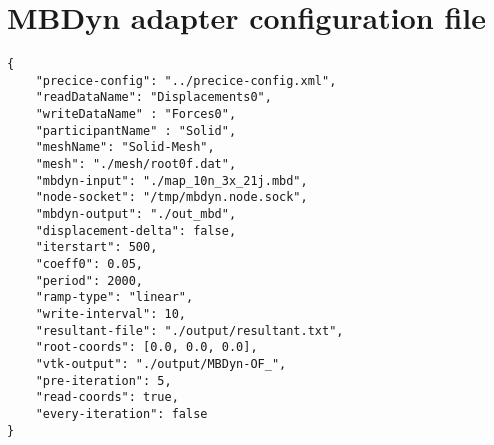 \chapter{MBDyn adapter configuration file}
\label{app:mbd-config-file}

\lstset{language=json}
\begin{lstlisting}[caption=MBDyn adapter configuration file example, label=adapter-config]
{
	"precice-config": "../precice-config.xml",
	"readDataName": "Displacements0",
	"writeDataName" : "Forces0",
	"participantName" : "Solid",
	"meshName": "Solid-Mesh",
	"mesh": "./mesh/root0f.dat",
	"mbdyn-input": "./map_10n_3x_21j.mbd",
	"node-socket": "/tmp/mbdyn.node.sock",
	"mbdyn-output": "./out_mbd",
	"displacement-delta": false,
	"iterstart": 500,
	"coeff0": 0.05,
	"period": 2000,
	"ramp-type": "linear",
	"write-interval": 10,
	"resultant-file": "./output/resultant.txt",
	"root-coords": [0.0, 0.0, 0.0],
	"vtk-output": "./output/MBDyn-OF_",
	"pre-iteration": 5,
	"read-coords": true,
	"every-iteration": false
}
\end{lstlisting}